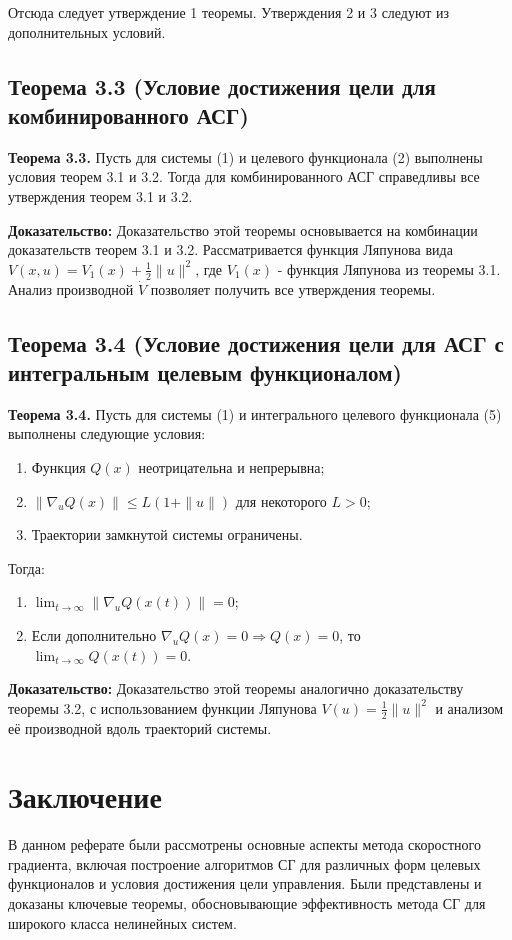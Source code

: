 \documentclass[14pt,a4paper]{article}
\begin{document}
Отсюда следует утверждение 1 теоремы. Утверждения 2 и 3 следуют из дополнительных условий.

\subsection{Теорема 3.3 (Условие достижения цели для комбинированного АСГ)}
\textbf{Теорема 3.3.} Пусть для системы (1) и целевого функционала (2) выполнены условия теорем 3.1 и 3.2. Тогда для комбинированного АСГ справедливы все утверждения теорем 3.1 и 3.2.

\textbf{Доказательство:}
Доказательство этой теоремы основывается на комбинации доказательств теорем 3.1 и 3.2. Рассматривается функция Ляпунова вида $V(x,u) = V_1(x) + \frac{1}{2}\|u\|^2$, где $V_1(x)$ - функция Ляпунова из теоремы 3.1. Анализ производной $\dot{V}$ позволяет получить все утверждения теоремы.

\subsection{Теорема 3.4 (Условие достижения цели для АСГ с интегральным целевым функционалом)}
\textbf{Теорема 3.4.} Пусть для системы (1) и интегрального целевого функционала (5) выполнены следующие условия:
\begin{enumerate}
    \item Функция $Q(x)$ неотрицательна и непрерывна;
    \item $\|\nabla_u Q(x)\| \leq L(1 + \|u\|)$ для некоторого $L > 0$;
    \item Траектории замкнутой системы ограничены.
\end{enumerate}
Тогда:
\begin{enumerate}
    \item $\lim_{t \to \infty} \|\nabla_u Q(x(t))\| = 0$;
    \item Если дополнительно $\nabla_u Q(x) = 0 \Rightarrow Q(x) = 0$, то $\lim_{t \to \infty} Q(x(t)) = 0$.
\end{enumerate}

\textbf{Доказательство:}
Доказательство этой теоремы аналогично доказательству теоремы 3.2, с использованием функции Ляпунова $V(u) = \frac{1}{2}\|u\|^2$ и анализом её производной вдоль траекторий системы.

\section{Заключение}
В данном реферате были рассмотрены основные аспекты метода скоростного градиента, включая построение алгоритмов СГ для различных форм целевых функционалов и условия достижения цели управления. Были представлены и доказаны ключевые теоремы, обосновывающие эффективность метода СГ для широкого класса нелинейных систем.
\end{document}
